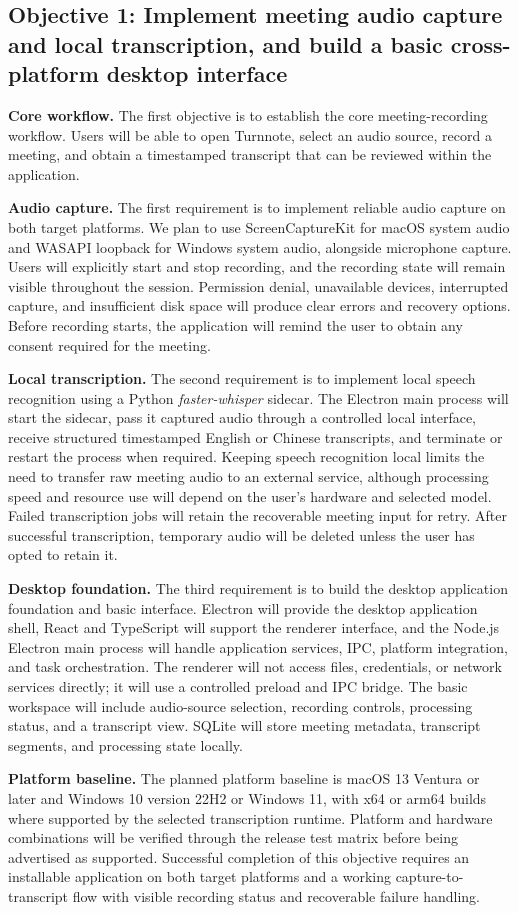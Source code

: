 \documentclass[12pt,a4paper]{article}
\begin{document}
\subsection*{Objective 1: Implement meeting audio capture and local transcription, and build a basic cross-platform desktop interface}
\textbf{Core workflow.} The first objective is to establish the core meeting-recording workflow. Users will be able to open Turnnote, select an audio source, record a meeting, and obtain a timestamped transcript that can be reviewed within the application.\par
\textbf{Audio capture.} The first requirement is to implement reliable audio capture on both target platforms. We plan to use ScreenCaptureKit for macOS system audio and WASAPI loopback for Windows system audio, alongside microphone capture. Users will explicitly start and stop recording, and the recording state will remain visible throughout the session. Permission denial, unavailable devices, interrupted capture, and insufficient disk space will produce clear errors and recovery options. Before recording starts, the application will remind the user to obtain any consent required for the meeting.\par
\textbf{Local transcription.} The second requirement is to implement local speech recognition using a Python \textit{faster-whisper} sidecar. The Electron main process will start the sidecar, pass it captured audio through a controlled local interface, receive structured timestamped English or Chinese transcripts, and terminate or restart the process when required. Keeping speech recognition local limits the need to transfer raw meeting audio to an external service, although processing speed and resource use will depend on the user's hardware and selected model. Failed transcription jobs will retain the recoverable meeting input for retry. After successful transcription, temporary audio will be deleted unless the user has opted to retain it.\par
\textbf{Desktop foundation.} The third requirement is to build the desktop application foundation and basic interface. Electron will provide the desktop application shell, React and TypeScript will support the renderer interface, and the Node.js Electron main process will handle application services, IPC, platform integration, and task orchestration. The renderer will not access files, credentials, or network services directly; it will use a controlled preload and IPC bridge. The basic workspace will include audio-source selection, recording controls, processing status, and a transcript view. SQLite will store meeting metadata, transcript segments, and processing state locally.\par
\textbf{Platform baseline.} The planned platform baseline is macOS 13 Ventura or later and Windows 10 version 22H2 or Windows 11, with x64 or arm64 builds where supported by the selected transcription runtime. Platform and hardware combinations will be verified through the release test matrix before being advertised as supported. Successful completion of this objective requires an installable application on both target platforms and a working capture-to-transcript flow with visible recording status and recoverable failure handling.\par
{}
\end{document}
